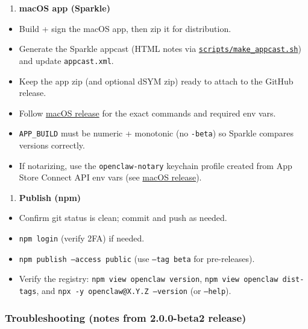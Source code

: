 \begin{enumerate}
  \item \textbf{macOS app (Sparkle)}
\end{enumerate}


\begin{itemize}
  \item [ ] Build + sign the macOS app, then zip it for distribution.
  \item [ ] Generate the Sparkle appcast (HTML notes via \href{https://github.com/openclaw/openclaw/blob/main/scripts/make\_appcast.sh}{\texttt{scripts/make\_appcast.sh}}) and update \texttt{appcast.xml}.
  \item [ ] Keep the app zip (and optional dSYM zip) ready to attach to the GitHub release.
  \item [ ] Follow \href{/platforms/mac/release}{macOS release} for the exact commands and required env vars.
  \item \texttt{APP\_BUILD} must be numeric + monotonic (no \texttt{-beta}) so Sparkle compares versions correctly.
  \item If notarizing, use the \texttt{openclaw-notary} keychain profile created from App Store Connect API env vars (see \href{/platforms/mac/release}{macOS release}).
\end{itemize}


\begin{enumerate}
  \item \textbf{Publish (npm)}
\end{enumerate}


\begin{itemize}
  \item [ ] Confirm git status is clean; commit and push as needed.
  \item [ ] \texttt{npm login} (verify 2FA) if needed.
  \item [ ] \texttt{npm publish --access public} (use \texttt{--tag beta} for pre-releases).
  \item [ ] Verify the registry: \texttt{npm view openclaw version}, \texttt{npm view openclaw dist-tags}, and \texttt{npx -y openclaw@X.Y.Z --version} (or \texttt{--help}).
\end{itemize}


\subsubsection{Troubleshooting (notes from 2.0.0-beta2 release)}


